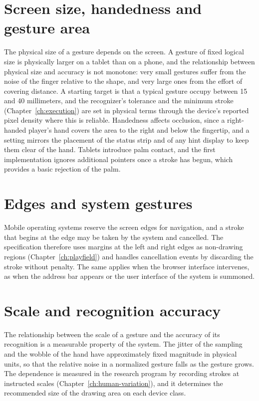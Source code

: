 \section{Screen size, handedness and gesture area}

The physical size of a gesture depends on the screen. A gesture of fixed logical size is physically larger on a tablet than on a phone, and the relationship between physical size and accuracy is not monotone: very small gestures suffer from the noise of the finger relative to the shape, and very large ones from the effort of covering distance. A starting target is that a typical gesture occupy between 15 and 40 millimeters, and the recognizer's tolerance and the minimum stroke (Chapter~\ref{ch:execution}) are set in physical terms through the device's reported pixel density where this is reliable.\evH{} Handedness affects occlusion, since a right-handed player's hand covers the area to the right and below the fingertip, and a setting mirrors the placement of the status strip and of any hint display to keep them clear of the hand. Tablets introduce palm contact, and the first implementation ignores additional pointers once a stroke has begun, which provides a basic rejection of the palm.

\section{Edges and system gestures}

Mobile operating systems reserve the screen edges for navigation, and a stroke that begins at the edge may be taken by the system and cancelled. The specification therefore uses margins at the left and right edges as non-drawing regions (Chapter~\ref{ch:playfield}) and handles cancellation events by discarding the stroke without penalty. The same applies when the browser interface intervenes, as when the address bar appears or the user interface of the system is summoned.

\section{Scale and recognition accuracy}

The relationship between the scale of a gesture and the accuracy of its recognition is a measurable property of the system. The jitter of the sampling and the wobble of the hand have approximately fixed magnitude in physical units, so that the relative noise in a normalized gesture falls as the gesture grows. The dependence is measured in the research program by recording strokes at instructed scales (Chapter~\ref{ch:human-variation}), and it determines the recommended size of the drawing area on each device class.

